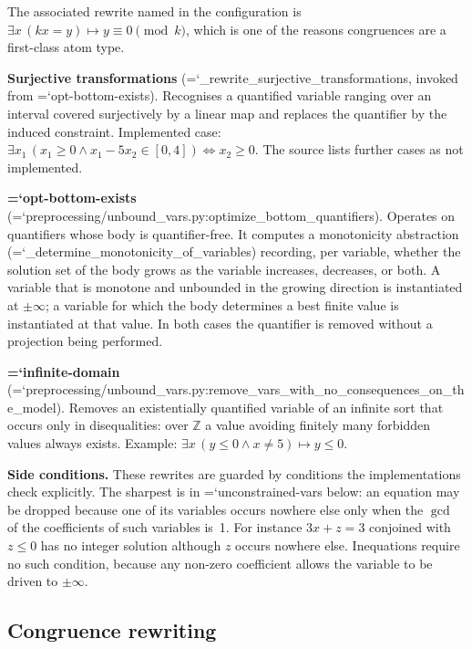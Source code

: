 \documentclass[10pt,a4paper]{article}
\newcommand{\code}[1]{{\small\ttfamily\hyphenchar\font=`\-\relax #1}}
\newcommand{\Int}{\mathbb{Z}}
\begin{document}
The associated rewrite named in the configuration is
$\exists x\,(k x = y) \mapsto y \equiv 0 \pmod k$, which is one of the reasons congruences are a
first-class atom type.

\textbf{Surjective transformations} (\code{\_\allowbreak rewrite\_\allowbreak surjective\_\allowbreak transformations}, invoked from
\code{opt-bottom-exists}).  Recognises a quantified variable ranging over an interval covered
surjectively by a linear map and replaces the quantifier by the induced constraint.  Implemented case:
$\exists x_1\,(x_1 \geq 0 \wedge x_1 - 5x_2 \in [0,4]) \iff x_2 \geq 0$.  The source lists further
cases as not implemented.

\textbf{\code{opt-bottom-exists}}
(\code{preprocessing/unbound\_\allowbreak vars.py:\allowbreak optimize\_\allowbreak bottom\_\allowbreak quantifiers}).  Operates on quantifiers whose
body is quantifier-free.  It computes a monotonicity abstraction
(\code{\_\allowbreak determine\_\allowbreak monotonicity\_\allowbreak of\_\allowbreak variables}) recording, per variable, whether the solution set of
the body grows as the variable increases, decreases, or both.  A variable that is monotone and
unbounded in the growing direction is instantiated at $\pm\infty$; a variable for which the body
determines a best finite value is instantiated at that value.  In both cases the quantifier is removed
without a projection being performed.

\textbf{\code{infinite-domain}}
(\code{preprocessing/unbound\_\allowbreak vars.py:\allowbreak remove\_\allowbreak vars\_\allowbreak with\_\allowbreak no\_\allowbreak consequences\_\allowbreak on\_\allowbreak the\_\allowbreak model}).  Removes
an existentially quantified variable of an infinite sort that occurs only in disequalities: over $\Int$
a value avoiding finitely many forbidden values always exists.  Example:
$\exists x\,(y \leq 0 \wedge x \neq 5) \mapsto y \leq 0$.

\textbf{Side conditions.}  These rewrites are guarded by conditions the implementations check
explicitly.  The sharpest is in \code{unconstrained-vars} below: an equation may be dropped because one
of its variables occurs nowhere else only when the $\gcd$ of the coefficients of such variables is~1.
For instance $3x + z = 3$ conjoined with $z \leq 0$ has no integer solution although $z$ occurs nowhere
else.  Inequations require no such condition, because any non-zero coefficient allows the variable to
be driven to $\pm\infty$.

\subsection{Congruence rewriting}
\label{sec:passes-congruence}
\end{document}
